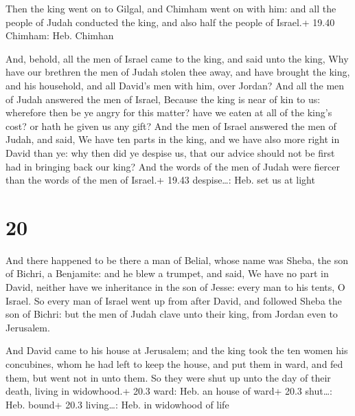  Then the king went on to Gilgal, and Chimham went on with
him: and all the people of Judah conducted the king, and also half the
people of Israel.+ 19.40 Chimham: Heb. Chimhan

 And, behold, all the men of Israel came to the king, and
said unto the king, Why have our brethren the men of Judah stolen thee
away, and have brought the king, and his household, and all David's men
with him, over Jordan?  And all the men of Judah answered
the men of Israel, Because the king is near of kin to us: wherefore then
be ye angry for this matter? have we eaten at all of the king's cost? or
hath he given us any gift?  And the men of Israel answered
the men of Judah, and said, We have ten parts in the king, and we have
also more right in David than ye: why then did ye despise us, that our
advice should not be first had in bringing back our king? And the words
of the men of Judah were fiercer than the words of the men of Israel.+
19.43 despise\ldots: Heb. set us at light

\hypertarget{section-19}{%
\section{20}\label{section-19}}

 And there happened to be there a man of Belial, whose name
was Sheba, the son of Bichri, a Benjamite: and he blew a trumpet, and
said, We have no part in David, neither have we inheritance in the son
of Jesse: every man to his tents, O Israel.  So every man of
Israel went up from after David, and followed Sheba the son of Bichri:
but the men of Judah clave unto their king, from Jordan even to
Jerusalem.

 And David came to his house at Jerusalem; and the king
took the ten women his concubines, whom he had left to keep the house,
and put them in ward, and fed them, but went not in unto them. So they
were shut up unto the day of their death, living in widowhood.+ 20.3
ward: Heb. an house of ward+ 20.3 shut\ldots: Heb. bound+ 20.3
living\ldots: Heb. in widowhood of life

